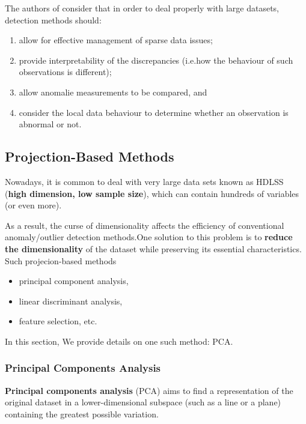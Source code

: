 \noindent The authors of \cite{AYU} consider that in order to deal properly with large datasets, detection methods should:
\begin{enumerate}[noitemsep]
\item allow for effective management of sparse data issues;
\item provide interpretability of the discrepancies (i.e.\@ how the behaviour of such observations is different);
\item allow anomalie measurements to be compared, and 
\item consider the local data behaviour to determine whether an observation is abnormal or not.
\end{enumerate}
%
\subsection{Projection-Based Methods}
Nowadays, it is common to deal with very large data sets known as HDLSS (\textbf{high dimension, low sample size}), which can contain hundreds of variables (or even more). \par As a result,  the curse of dimensionality affects the efficiency of conventional anomaly/outlier detection methods.\newl One solution to this problem is to \textbf{reduce the dimensionality} of the dataset while preserving its essential characteristics. Such projecion-based methods \begin{itemize}[noitemsep]\item principal component analysis, \item linear discriminant analysis, \item feature selection, etc. \end{itemize} In this section, We provide details on one such method: PCA.
\subsubsection*{Principal Components Analysis}
%
\textbf{Principal components analysis} (PCA) aims to find a representation of the original dataset in a lower-dimensional subspace (such as a line or a plane)  containing the greatest possible variation. 

